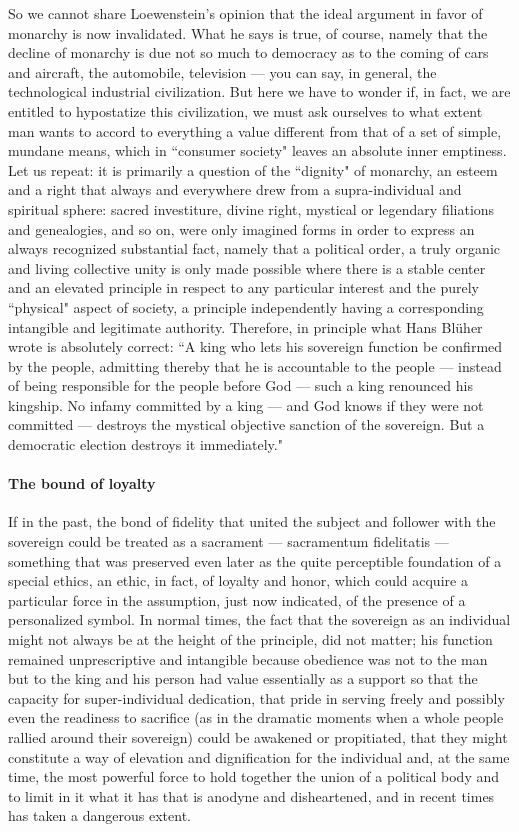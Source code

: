 So we cannot share Loewenstein's opinion that the ideal argument in favor of monarchy is now invalidated. What he says is true, of course, namely that the decline of monarchy is due not so much to democracy as to the coming of cars and aircraft, the automobile, television — you can say, in general, the technological industrial civilization. But here we have to wonder if, in fact, we are entitled to hypostatize this civilization, we must ask ourselves to what extent man wants to accord to everything a value different from that of a set of simple, mundane means, which in ``consumer society" leaves an absolute inner emptiness. Let us repeat: it is primarily a question of the ``dignity" of monarchy, an esteem and a right that always and everywhere drew from a supra-individual and spiritual sphere: sacred investiture, divine right, mystical or legendary filiations and genealogies, and so on, were only imagined forms in order to express an always recognized substantial fact, namely that a political order, a truly organic and living collective unity is only made possible where there is a stable center and an elevated principle in respect to any particular interest and the purely ``physical" aspect of society, a principle independently having a corresponding intangible and legitimate authority. Therefore, in principle what Hans Blüher wrote is absolutely correct: ``A king who lets his sovereign function be confirmed by the people, admitting thereby that he is accountable to the people — instead of being responsible for the people before God — such a king renounced his kingship. No infamy committed by a king — and God knows if they were not committed — destroys the mystical objective sanction of the sovereign. But a democratic election destroys it immediately."

\paragraph{The bound of loyalty} If in the past, the bond of fidelity that united the subject and follower with the sovereign could be treated as a sacrament — sacramentum fidelitatis — something that was preserved even later as the quite perceptible foundation of a special ethics, an ethic, in fact, of loyalty and honor, which could acquire a particular force in the assumption, just now indicated, of the presence of a personalized symbol. In normal times, the fact that the sovereign as an individual might not always be at the height of the principle, did not matter; his function remained unprescriptive and intangible because obedience was not to the man but to the king and his person had value essentially as a support so that the capacity for super-individual dedication, that pride in serving freely and possibly even the readiness to sacrifice (as in the dramatic moments when a whole people rallied around their sovereign) could be awakened or propitiated, that they might constitute a way of elevation and dignification for the individual and, at the same time, the most powerful force to hold together the union of a political body and to limit in it what it has that is anodyne and disheartened, and in recent times has taken a dangerous extent.

